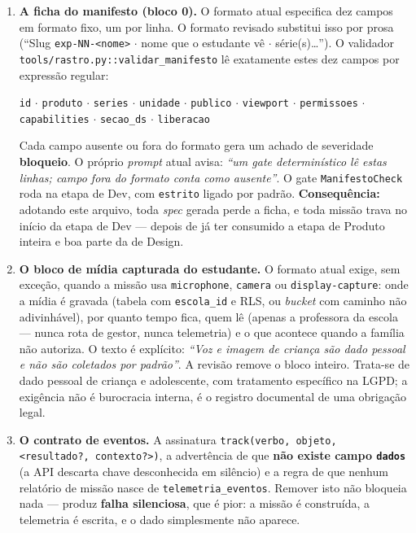 \documentclass[11pt,a4paper]{article}
\newcommand{\cod}[1]{\texttt{\small #1}}
\begin{document}
\begin{enumerate}[leftmargin=*,itemsep=3pt]
  \item \textbf{A ficha do manifesto (bloco 0).} O formato atual especifica dez campos em formato fixo, um
  por linha. O formato revisado substitui isso por prosa (``Slug \cod{exp-NN-<nome>} $\cdot$ nome que o
  estudante vê $\cdot$ série(s)\ldots''). O validador \cod{tools/rastro.py::validar\_manifesto} lê
  exatamente estes dez campos por expressão regular:

  \begin{center}
  \cod{id} $\cdot$ \cod{produto} $\cdot$ \cod{series} $\cdot$ \cod{unidade} $\cdot$ \cod{publico} $\cdot$
  \cod{viewport} $\cdot$ \cod{permissoes} $\cdot$ \cod{capabilities} $\cdot$ \cod{secao\_ds} $\cdot$ \cod{liberacao}
  \end{center}

  Cada campo ausente ou fora do formato gera um achado de severidade \textbf{bloqueio}. O próprio
  \textit{prompt} atual avisa: \textit{``um gate determinístico lê estas linhas; campo fora do formato conta
  como ausente''}. O gate \cod{ManifestoCheck} roda na etapa de Dev, com \cod{estrito} ligado por padrão.
  \textbf{Consequência:} adotando este arquivo, toda \textit{spec} gerada perde a ficha, e toda missão trava
  no início da etapa de Dev --- depois de já ter consumido a etapa de Produto inteira e boa parte da de
  Design.

  \item \textbf{O bloco de mídia capturada do estudante.} O formato atual exige, sem exceção, quando a
  missão usa \cod{microphone}, \cod{camera} ou \cod{display-capture}: onde a mídia é gravada (tabela com
  \cod{escola\_id} e RLS, ou \textit{bucket} com caminho não adivinhável), por quanto tempo fica, quem lê
  (apenas a professora da escola --- nunca rota de gestor, nunca telemetria) e o que acontece quando a
  família não autoriza. O texto é explícito: \textit{``Voz e imagem de criança são dado pessoal e não são
  coletados por padrão''}. A revisão remove o bloco inteiro. Trata-se de dado pessoal de criança e
  adolescente, com tratamento específico na LGPD; a exigência não é burocracia interna, é o registro
  documental de uma obrigação legal.

  \item \textbf{O contrato de eventos.} A assinatura \cod{track(verbo, objeto, <resultado?, contexto?>)},
  a advertência de que \textbf{não existe campo \cod{dados}} (a API descarta chave desconhecida em silêncio)
  e a regra de que nenhum relatório de missão nasce de \cod{telemetria\_eventos}. Remover isto não bloqueia
  nada --- produz \textbf{falha silenciosa}, que é pior: a missão é construída, a telemetria é escrita, e o
  dado simplesmente não aparece.


\end{enumerate}
\end{document}
